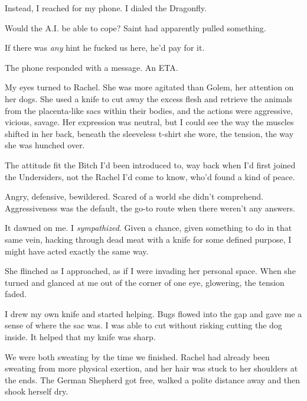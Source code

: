 Instead, I reached for my phone.  I dialed the Dragonfly.



Would the A.I. be able to cope?  Saint had apparently pulled something.



If there was \emph{any} hint he fucked us here, he'd pay for it.



The phone responded with a message.  An ETA.



My eyes turned to Rachel.  She was more agitated than Golem, her attention on her dogs.  She used a knife to cut away the excess flesh and retrieve the animals from the placenta-like sacs within their bodies, and the actions were aggressive, vicious, savage.  Her expression was neutral, but I could see the way the muscles shifted in her back, beneath the sleeveless t-shirt she wore, the tension, the way she was hunched over.



The attitude fit the Bitch I'd been introduced to, way back when I'd first joined the Undersiders, not the Rachel I'd come to know, who'd found a kind of peace.



Angry, defensive, bewildered.  Scared of a world she didn't comprehend.  Aggressiveness was the default, the go-to route when there weren't any answers.



It dawned on me.  I \emph{sympathized}.  Given a chance, given something to do in that same vein, hacking through dead meat with a knife for some defined purpose, I might have acted exactly the same way.



She flinched as I approached, as if I were invading her personal space.  When she turned and glanced at me out of the corner of one eye, glowering, the tension faded.



I drew my own knife and started helping.  Bugs flowed into the gap and gave me a sense of where the sac was.  I was able to cut without risking cutting the dog inside.  It helped that my knife was sharp.



We were both sweating by the time we finished.  Rachel had already been sweating from more physical exertion, and her hair was stuck to her shoulders at the ends.  The German Shepherd got free, walked a polite distance away and then shook herself dry.



